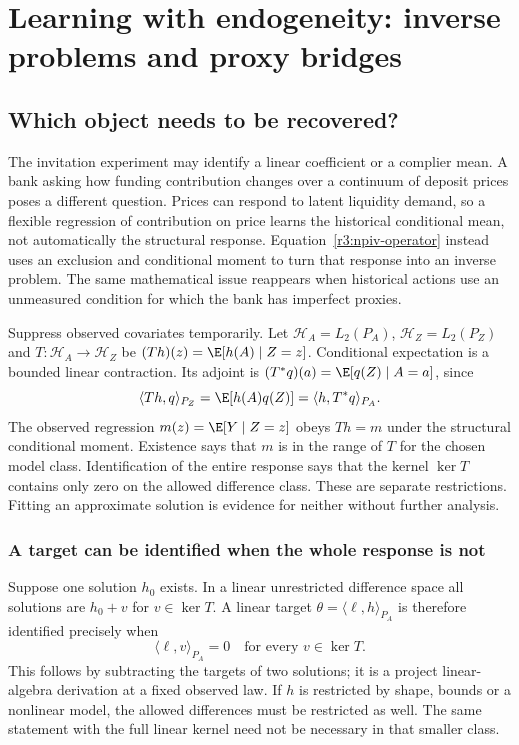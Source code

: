 \chapter{Learning with endogeneity: inverse problems and proxy bridges}
\label{r3:inverse-learning}
\section{Which object needs to be recovered?}
The invitation experiment may identify a linear coefficient or a complier
mean. A bank asking how funding contribution changes over a continuum of
deposit prices poses a different question. Prices can respond to latent
liquidity demand, so a flexible regression of contribution on price learns
the historical conditional mean, not automatically the structural response.
Equation~\eqref{r3:npiv-operator} instead uses an exclusion and conditional
moment to turn that response into an inverse problem. The same mathematical
issue reappears when historical actions use an unmeasured condition for
which the bank has imperfect proxies.

Suppress observed covariates temporarily. Let
$\mathcal H_A=L_2(P_A)$, $\mathcal H_Z=L_2(P_Z)$ and
$T:\mathcal H_A\to\mathcal H_Z$ be
$(Th)(z)=\E[h(A)\mid Z=z]$. Conditional expectation is a bounded
linear contraction. Its adjoint is
$(T^*q)(a)=\E[q(Z)\mid A=a]$, since
\[
 \langle Th,q\rangle_{P_Z}
 =\E[h(A)q(Z)]=\langle h,T^*q\rangle_{P_A}.
\]
The observed regression $m(z)=\E[Y\mid Z=z]$ obeys $Th=m$ under
the structural conditional moment. Existence says that $m$ is in the
range of $T$ for the chosen model class. Identification of the entire
response says that the kernel $\ker T$ contains only zero on the
allowed difference class. These are separate restrictions. Fitting
an approximate solution is evidence for neither without further analysis.

\subsection{A target can be identified when the whole response is not}
\label{r3:inverse-functional}
Suppose one solution $h_0$ exists. In a linear unrestricted difference
space all solutions are $h_0+v$ for $v\in\ker T$. A linear target
$\theta=\langle\ell,h\rangle_{P_A}$ is therefore identified precisely
when
\begin{equation}
 \langle\ell,v\rangle_{P_A}=0\quad\text{for every }v\in\ker T.
 \label{r3:null-functional}
\end{equation}
This follows by subtracting the targets of two solutions; it is a
project linear-algebra derivation at a fixed observed law. If $h$ is
restricted by shape, bounds or a nonlinear model, the allowed differences
must be restricted as well. The same statement with the full linear
kernel need not be necessary in that smaller class.

